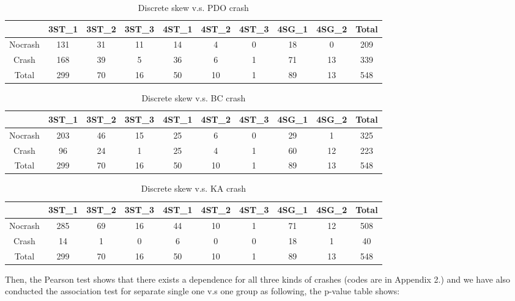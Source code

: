\documentclass[11pt]{scrartcl} %
\begin{document}
\begin{table}[H]
\caption{Discrete skew v.s. PDO crash}
\centering
\begin{tabular}{|c|c|c|c|c|c|c|c|c|c|}
\hline
      & 3ST\_1 & 3ST\_2 & 3ST\_3 & 4ST\_1 & 4ST\_2 & 4ST\_3 & 4SG\_1 & 4SG\_2 & Total \\
\hline
Nocrash & 131 & 31  & 11 & 14 & 4 & 0 & 18 & 0 & 209\\
\hline
Crash    & 168  & 39  & 5  & 36 & 6 & 1 & 71 & 13 & 339\\
\hline
Total    & 299  & 70  & 16  & 50 & 10 & 1 & 89 & 13 & 548 \\
\hline
\end{tabular}
\end{table}

\begin{table}[H]
\caption{Discrete skew v.s. BC crash}
\centering
\begin{tabular}{|c|c|c|c|c|c|c|c|c|c|}
\hline
      & 3ST\_1 & 3ST\_2 & 3ST\_3 & 4ST\_1 & 4ST\_2 & 4ST\_3 & 4SG\_1 & 4SG\_2 & Total \\
\hline
Nocrash & 203 & 46  & 15 & 25 & 6 & 0 &  29 & 1 & 325\\
\hline
Crash    & 96  & 24  & 1  &  25 & 4 & 1 & 60 & 12 & 223\\
\hline
Total    & 299  & 70  & 16  & 50 & 10 & 1 & 89 & 13 & 548 \\
\hline
\end{tabular}
\end{table}

\begin{table}[H]
\caption{Discrete skew v.s. KA crash}
\centering
\begin{tabular}{|c|c|c|c|c|c|c|c|c|c|}
\hline
      & 3ST\_1 & 3ST\_2 & 3ST\_3 & 4ST\_1 & 4ST\_2 & 4ST\_3 & 4SG\_1 & 4SG\_2 & Total \\
\hline
Nocrash &  285  & 69  & 16 & 44 & 10 &  1 &  71 & 12 &  508\\
\hline
Crash    & 14  & 1  & 0  &  6 & 0 & 0 & 18 & 1 & 40\\
\hline
Total    & 299  & 70  & 16  & 50 & 10 & 1 & 89 & 13 & 548 \\
\hline
\end{tabular}
\end{table}

Then, the Pearson test shows that there exists a dependence for all three kinds of crashes (codes are in Appendix 2.) and we have also conducted the association test for separate single one v.s one group as following, the p-value table shows:
\end{document}
